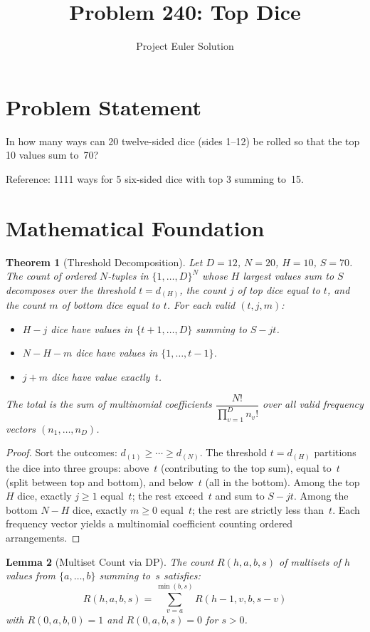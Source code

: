 \documentclass[12pt]{article}
\title{Problem 240: Top Dice}
\author{Project Euler Solution}
\date{}
\newtheorem{theorem}{Theorem}
\newtheorem{lemma}[theorem]{Lemma}
\begin{document}
\maketitle

\section{Problem Statement}
In how many ways can 20 twelve-sided dice (sides 1--12) be rolled so that the top 10 values sum to~70?

Reference: 1111 ways for 5 six-sided dice with top 3 summing to~15.

\section{Mathematical Foundation}

\begin{theorem}[Threshold Decomposition]
Let $D = 12$, $N = 20$, $H = 10$, $S = 70$. The count of ordered $N$-tuples in $\{1,\ldots,D\}^N$ whose $H$ largest values sum to $S$ decomposes over the threshold $t = d_{(H)}$, the count $j$ of top dice equal to $t$, and the count $m$ of bottom dice equal to $t$. For each valid $(t, j, m)$:
\begin{itemize}
\item $H - j$ dice have values in $\{t{+}1,\ldots,D\}$ summing to $S - jt$.
\item $N - H - m$ dice have values in $\{1,\ldots,t{-}1\}$.
\item $j + m$ dice have value exactly~$t$.
\end{itemize}
The total is the sum of multinomial coefficients $\dfrac{N!}{\prod_{v=1}^{D} n_v!}$ over all valid frequency vectors $(n_1,\ldots,n_D)$.
\end{theorem}

\begin{proof}
Sort the outcomes: $d_{(1)} \geq \cdots \geq d_{(N)}$. The threshold $t = d_{(H)}$ partitions the dice into three groups: above~$t$ (contributing to the top sum), equal to~$t$ (split between top and bottom), and below~$t$ (all in the bottom). Among the top $H$ dice, exactly $j \geq 1$ equal~$t$; the rest exceed~$t$ and sum to $S - jt$. Among the bottom $N{-}H$ dice, exactly $m \geq 0$ equal~$t$; the rest are strictly less than~$t$. Each frequency vector yields a multinomial coefficient counting ordered arrangements.
\end{proof}

\begin{lemma}[Multiset Count via DP]
The count $R(h, a, b, s)$ of multisets of $h$ values from $\{a,\ldots,b\}$ summing to~$s$ satisfies:
\[
R(h, a, b, s) = \sum_{v=a}^{\min(b,s)} R(h{-}1, v, b, s{-}v)
\]
with $R(0, a, b, 0) = 1$ and $R(0, a, b, s) = 0$ for $s > 0$.
\end{lemma}
\end{document}
